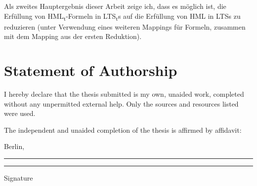 \documentclass[11pt,a4paper,openany]{book}
\newcommand{\LTSt}{LTS\textsubscript{t}}
\newcommand{\HMLt}{HML\textsubscript{t}}
\begin{document}
Als zweites Hauptergebnis dieser Arbeit zeige ich, dass es möglich ist, die Erfüllung von \HMLt{}-Formeln in \LTSt{}s auf die Erfüllung von HML in LTSs zu reduzieren (unter Verwendung eines weiteren Mappings für Formeln, zusammen mit dem Mapping aus der ersten Reduktion).

\thispagestyle{empty}

\newpage
{}
\chapter*{Statement of Authorship}

I hereby declare that the thesis submitted is my own, unaided work, completed without any
unpermitted external help. Only the sources and resources listed were used.

The independent and unaided completion of the thesis is affirmed by affidavit:

\vspace{3cm}

Berlin, \rule{2cm}{.2pt}\hspace{2cm}\rule{5.5cm}{.2pt}

\hspace{7cm} Signature


\thispagestyle{empty}
\end{document}
